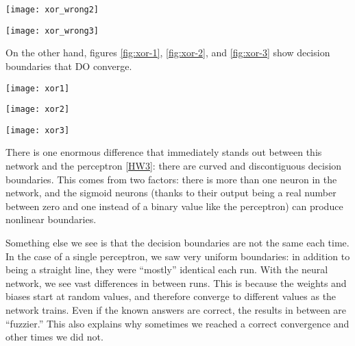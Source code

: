 \documentclass[letter,11pt,titlepage]{article}
\begin{document}
\begin{center}
    \centering
    \texttt{[image: xor\_wrong2]}
    \label{fig:xor-wrong2}
\end{center}

\begin{center}
    \centering
    \texttt{[image: xor\_wrong3]}
    \label{fig:xor-wrong3}
\end{center}

On the other hand, figures \ref{fig:xor-1}, \ref{fig:xor-2}, and \ref{fig:xor-3} show decision boundaries that DO converge.

\begin{center}
    \centering
    \texttt{[image: xor1]}
    \label{fig:xor-1}
\end{center}

\begin{center}
    \centering
    \texttt{[image: xor2]}
    \label{fig:xor-2}
\end{center}

\begin{center}
    \centering
    \texttt{[image: xor3]}
    \label{fig:xor-3}
\end{center}

There is one enormous difference that immediately stands out between this network and the perceptron \ref{HW3}: there are curved and discontiguous decision boundaries. This comes from two factors: there is more than one neuron in the network, and the sigmoid neurons (thanks to their output being a real number between zero and one instead of a binary value like the perceptron) can produce nonlinear boundaries.

Something else we see is that the decision boundaries are not the same each time. In the case of a single perceptron, we saw very uniform boundaries: in addition to being a straight line, they were ``mostly'' identical each run. With the neural network, we see vast differences in between runs. This is because the weights and biases start at random values, and therefore converge to different values as the network trains. Even if the known answers are correct, the results in between are ``fuzzier.'' This also explains why sometimes we reached a correct convergence and other times we did not.
\end{document}
